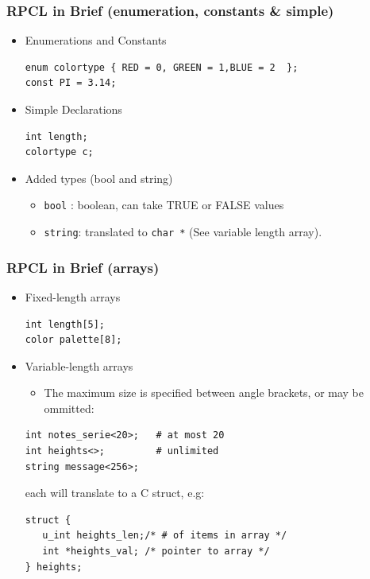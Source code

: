 \documentclass[bigger,hyperref={colorlinks=true, urlcolor=red, plainpages=false, pdfpagelabels, bookmarksnumbered}]{beamer}
\begin{document}
\begin{frame}[fragile]
\frametitle{RPCL in Brief (enumeration, constants \& simple)}
\label{sec-2-18}
\begin{itemize}

\item Enumerations and Constants\\
\label{sec-2-18-1}%
\lstset{language=C}
\begin{lstlisting}
enum colortype { RED = 0, GREEN = 1,BLUE = 2  };
const PI = 3.14;
\end{lstlisting}

\item Simple Declarations\\
\label{sec-2-18-2}%
\lstset{language=C}
\begin{lstlisting}
int length;
colortype c;
\end{lstlisting}

\item Added types (bool and string)
\label{sec-2-18-3}%
\begin{itemize}
\item \texttt{bool} : boolean, can take TRUE or FALSE values
\item \texttt{string}: translated to \texttt{char *} (See variable length array).
\end{itemize}
\end{itemize} %
\end{frame}
\begin{frame}[fragile]
\frametitle{RPCL in Brief (arrays)}
\label{sec-2-19}
\begin{itemize}

\item Fixed-length arrays\\
\label{sec-2-19-1}%
\lstset{language=C}
\begin{lstlisting}
int length[5];
color palette[8];
\end{lstlisting}


\item Variable-length arrays
\label{sec-2-19-2}%
\begin{itemize}
\item The maximum size is specified between angle brackets, or may be ommitted:
\end{itemize}

\lstset{language=C}
\begin{lstlisting}
int notes_serie<20>;   # at most 20
int heights<>;         # unlimited
string message<256>;
\end{lstlisting}
each will translate to a C struct, e.g:

\lstset{language=C}
\begin{lstlisting}
struct {
   u_int heights_len;/* # of items in array */
   int *heights_val; /* pointer to array */
} heights;
\end{lstlisting}
\end{itemize} %
\end{frame}
\end{document}
